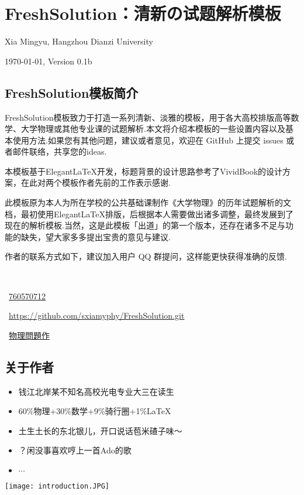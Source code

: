 \chapter{FreshSolution：清新の试题解析模板}
\centerline{Xia Mingyu, Hangzhou Dianzi University}

\centerline{\today, Version 0.1b}
\section{FreshSolution模板简介}
{
\color{Periwinkle}FreshSolution模板致力于打造一系列清新、淡雅的模板，用于各大高校排版高等数学、大学物理或其他专业课的试题解析.本文将介绍本模板的一些设置内容以及基本使用方法.如果您有其他问题，建议或者意见，欢迎在 GitHub 上提交 issues 或者邮件联络，共享您的ideas.

本模板基于Elegant\LaTeX 开发，标题背景的设计思路参考了VividBook的设计方案，在此对两个模板作者先前的工作表示感谢.

此模板原为本人为所在学校的公共基础课制作《大学物理》的历年试题解析的文档，最初使用Elegant\LaTeX 排版，后根据本人需要做出诸多调整，最终发展到了现在的解析模板.当然，这是此模板「出道」的第一个版本，还存在诸多不足与功能的缺失，望大家多多提出宝贵的意见与建议.

作者的联系方式如下，建议加入用户 QQ 群提问，这样能更快获得准确的反馈.

\begin{multicols}{2}

    \faEnvelope\ 
    
    \faQq\ \href{https://qm.qq.com/cgi-bin/qm/qr?k=gg5GsqSkGvZbC6TphVMlXRl08vqMV9Lw&authKey=rDcxqMdHwxWLQQBZwgfHduopCmVulM8CTWUhsGFOWyjqo6Ekk0omdoi4kuzxC/k4&noverify=0}{760570712}

    \faGithub\ \href{https://github.com/xiamyphys/FreshSolution.git}{https://github.com/sxiamyphy/FreshSolution.git}

    \faWechat\ \href{http://weixin.qq.com/r/hR1SSofEIdpercMp90iX}{物理問題作}
\end{multicols}

\newpage
\begin{multicols}{2}
\section{关于作者}
\bfseries
    \begin{itemize}
        \item 钱江北岸某不知名高校光电专业大三在读生
        \item 60\%物理+30\%数学+9\%骑行圈+1\%\LaTeX
        \item 土生土长的东北银儿，开口说话苞米碴子味～
        \item ？闲没事喜欢哼上一首Ado的歌
        \item $\cdots$
    \end{itemize}
    \newcolumn
    \begin{center}
        \vspace{1em}
        \texttt{[image: introduction.JPG]}
    \end{center}
\end{multicols}
\newpage
}
